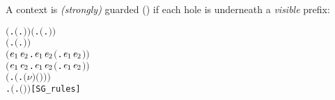 A context is \emph{(strongly)} guarded () if each hole
is underneath a \emph{visible} prefix:
\begin{alltt}
\HOLTokenTurnstile{} \ensuremath{(}\HOLSymConst{\HOLTokenForall{}}.  \ensuremath{(}\HOLTokenLambda{}. \ensuremath{)}\ensuremath{)} \HOLSymConst{\HOLTokenConj{}} \ensuremath{(}\HOLSymConst{\HOLTokenForall{}} .   \HOLSymConst{\HOLTokenImp{}}  \ensuremath{(}\HOLTokenLambda{}.  \HOLSymConst{\ensuremath{\ldotp}} \ensuremath{)}\ensuremath{)} \HOLSymConst{\HOLTokenConj{}}
   \ensuremath{(}\HOLSymConst{\HOLTokenForall{}} .   \HOLSymConst{\HOLTokenImp{}}  \ensuremath{(}\HOLTokenLambda{}. \HOLSymConst{\ensuremath{\ldotp}} \ensuremath{)}\ensuremath{)} \HOLSymConst{\HOLTokenConj{}}
   \ensuremath{(}\HOLSymConst{\HOLTokenForall{}}\ensuremath{\HOLBoundVar{e}\sb{\mathrm{1}}} \ensuremath{\HOLBoundVar{e}\sb{\mathrm{2}}}.  \ensuremath{\HOLBoundVar{e}\sb{\mathrm{1}}} \HOLSymConst{\HOLTokenConj{}}  \ensuremath{\HOLBoundVar{e}\sb{\mathrm{2}}} \HOLSymConst{\HOLTokenImp{}}  \ensuremath{(}\HOLTokenLambda{}. \ensuremath{\HOLBoundVar{e}\sb{\mathrm{1}}}  \HOLSymConst{\ensuremath{+}} \ensuremath{\HOLBoundVar{e}\sb{\mathrm{2}}} \ensuremath{)}\ensuremath{)} \HOLSymConst{\HOLTokenConj{}}
   \ensuremath{(}\HOLSymConst{\HOLTokenForall{}}\ensuremath{\HOLBoundVar{e}\sb{\mathrm{1}}} \ensuremath{\HOLBoundVar{e}\sb{\mathrm{2}}}.  \ensuremath{\HOLBoundVar{e}\sb{\mathrm{1}}} \HOLSymConst{\HOLTokenConj{}}  \ensuremath{\HOLBoundVar{e}\sb{\mathrm{2}}} \HOLSymConst{\HOLTokenImp{}}  \ensuremath{(}\HOLTokenLambda{}. \ensuremath{\HOLBoundVar{e}\sb{\mathrm{1}}}  \HOLSymConst{\ensuremath{\mid}} \ensuremath{\HOLBoundVar{e}\sb{\mathrm{2}}} \ensuremath{)}\ensuremath{)} \HOLSymConst{\HOLTokenConj{}}
   \ensuremath{(}\HOLSymConst{\HOLTokenForall{}} .   \HOLSymConst{\HOLTokenImp{}}  \ensuremath{(}\HOLTokenLambda{}. \ensuremath{(\nu}\ensuremath{)} \ensuremath{(} \ensuremath{)}\ensuremath{)}\ensuremath{)} \HOLSymConst{\HOLTokenConj{}}
   \HOLSymConst{\HOLTokenForall{}} .   \HOLSymConst{\HOLTokenImp{}}  \ensuremath{(}\HOLTokenLambda{}.  \ensuremath{(} \ensuremath{)} \ensuremath{)}\hfill{[SG_rules]}
\end{alltt}


